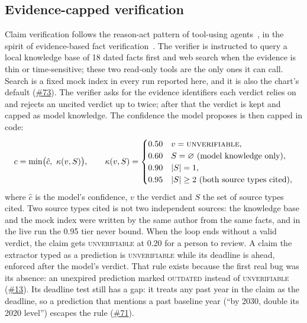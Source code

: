 \documentclass[11pt]{article}
\newcommand{\Ou}{\textsc{outdated}}
\newcommand{\U}{\textsc{unverifiable}}
\newcommand{\gh}[1]{\href{https://github.com/Organized-AI/podcast-agent/issues/#1}{\##1}}
\begin{document}
\subsection{Evidence-capped verification}\label{sec:verify}
Claim verification follows the reason-act pattern of tool-using agents~\citep{yao2023react}, in the spirit of evidence-based fact verification~\citep{thorne2018fever}. The verifier is instructed to query a local knowledge base of 18 dated facts first and web search when the evidence is thin or time-sensitive; these two read-only tools are the only ones it can call. Search is a fixed mock index in every run reported here, and it is also the chart's default (\gh{73}). The verifier asks for the evidence identifiers each verdict relies on and rejects an uncited verdict up to twice; after that the verdict is kept and capped as model knowledge. The confidence the model proposes is then capped in code:
\begin{equation}
c = \min\bigl(\hat c,\ \kappa(v, S)\bigr),\qquad
\kappa(v,S)=\begin{cases}
0.50 & v=\U{},\\
0.60 & S=\varnothing\ \text{(model knowledge only)},\\
0.90 & |S|=1,\\
0.95 & |S|\ge 2\ \text{(both source types cited)},
\end{cases}
\end{equation}
where $\hat c$ is the model's confidence, $v$ the verdict and $S$ the set of source types cited. Two source types cited is not two independent sources: the knowledge base and the mock index were written by the same author from the same facts, and in the live run the 0.95 tier never bound. When the loop ends without a valid verdict, the claim gets \U{} at 0.20 for a person to review. A claim the extractor typed as a prediction is \U{} while its deadline is ahead, enforced after the model's verdict. That rule exists because the first real bug was its absence: an unexpired prediction marked \Ou{} instead of \U{} (\gh{13}). Its deadline test still has a gap: it treats any past year in the claim as the deadline, so a prediction that mentions a past baseline year (``by 2030, double its 2020 level'') escapes the rule (\gh{71}).
\end{document}
